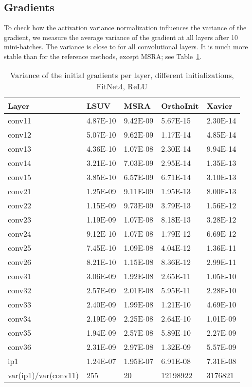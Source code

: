 \documentclass{article} \clearpage{}\usepackage{iclr2016_conference,times}
\begin{document}
\subsection{Gradients}
To check how the activation variance normalization influences the variance of the gradient, we measure the average variance of the gradient at all layers after 10 mini-batches. The variance is close to  for all convolutional layers. It is much more stable than for the reference methods, except MSRA; see Table~\ref{tab:grad-var}. 
\begin{table}[htb]
\caption{Variance of the initial gradients per layer, different initializations, FitNet4, ReLU}
\label{tab:grad-var}
\centering
\begin{tabular}{lllll}
\hline
Layer&LSUV&MSRA&OrthoInit&Xavier\\
\hline
conv11&4.87E-10&9.42E-09&5.67E-15&2.30E-14\\
conv12&5.07E-10&9.62E-09&1.17E-14&4.85E-14\\
conv13&4.36E-10&1.07E-08&2.30E-14&9.94E-14\\
conv14&3.21E-10&7.03E-09&2.95E-14&1.35E-13\\
conv15&3.85E-10&6.57E-09&6.71E-14&3.10E-13\\
\hline
conv21&1.25E-09&9.11E-09&1.95E-13&8.00E-13\\
conv22&1.15E-09&9.73E-09&3.79E-13&1.56E-12\\
conv23&1.19E-09&1.07E-08&8.18E-13&3.28E-12\\
conv24&9.12E-10&1.07E-08&1.79E-12&6.69E-12\\
conv25&7.45E-10&1.09E-08&4.04E-12&1.36E-11\\
conv26&8.21E-10&1.15E-08&8.36E-12&2.99E-11\\
\hline
conv31&3.06E-09&1.92E-08&2.65E-11&1.05E-10\\
conv32&2.57E-09&2.01E-08&5.95E-11&2.28E-10\\
conv33&2.40E-09&1.99E-08&1.21E-10&4.69E-10\\
conv34&2.19E-09&2.25E-08&2.64E-10&1.01E-09\\
conv35&1.94E-09&2.57E-08&5.89E-10&2.27E-09\\
conv36&2.31E-09&2.97E-08&1.32E-09&5.57E-09\\
\hline
ip1&1.24E-07&1.95E-07&6.91E-08&7.31E-08\\
\hline
var(ip1)/var(conv11)&255&20&12198922&3176821\\
\hline
\end{tabular}
\end{table}
\end{document}
